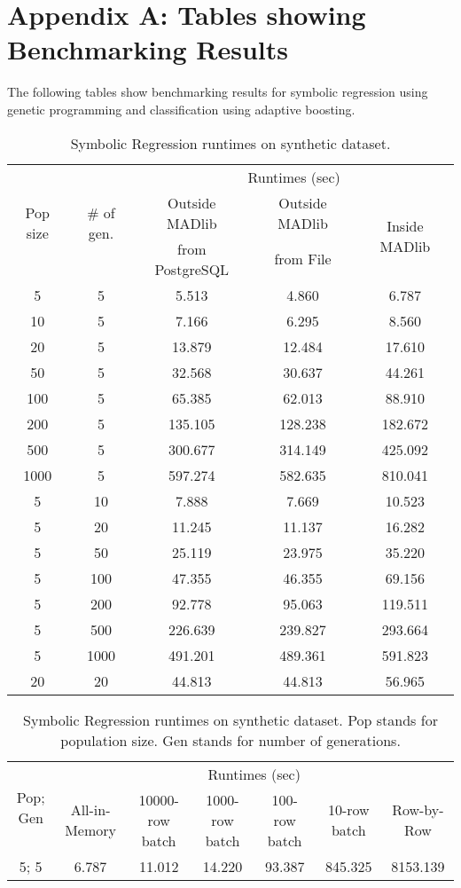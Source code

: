 \section*{Appendix A: Tables showing Benchmarking Results}
The following tables show benchmarking results for symbolic regression using genetic programming and classification using adaptive boosting.
\begin{table}[!htbp]
\small
\centering
\begin{tabular}{|c|c|c|c|c|}
\hline
\multirow{3}{*}{Pop size} & \multirow{3}{*}{\# of gen.} & \multicolumn{3}{|c|}{Runtimes (sec)}\\
\cline{3-5}
& &Outside MADlib&Outside MADlib&\multirow{2}{*}{Inside MADlib}\\
& &from PostgreSQL&from File&\\
\hline
5 & 5 & 5.513 & 4.860 & 6.787 \\ \hline
10& 5 & 7.166 & 6.295 & 8.560 \\\hline
20& 5 & 13.879 & 12.484 & 17.610 \\\hline
50& 5 & 32.568 & 30.637 & 44.261 \\\hline
100& 5 & 65.385 & 62.013 & 88.910 \\\hline
200& 5 & 135.105 & 128.238 & 182.672 \\\hline
500& 5 & 300.677 & 314.149 &425.092 \\\hline
1000& 5 & 597.274 &582.635 &810.041 \\\hline
5& 10 & 7.888 & 7.669& 10.523 \\\hline
5& 20 & 11.245 & 11.137 & 16.282 \\\hline
5& 50 & 25.119 & 23.975 & 35.220 \\\hline
5& 100 & 47.355 & 46.355 & 69.156 \\\hline
5& 200 & 92.778 & 95.063 & 119.511 \\\hline
5& 500 & 226.639 & 239.827 & 293.664 \\\hline
5& 1000 & 491.201 & 489.361 & 591.823 \\\hline
20& 20 & 44.813 & 44.813 & 56.965 \\
\hline
\end{tabular}
\caption{Symbolic Regression runtimes on synthetic dataset.}
\label{tab:GPruntimes}
\end{table}


\begin{table}[!htbp]
\small
\centering
\begin{tabular}{|c|c|c|c|c|c|c|}
\hline
\multirow{2}{*}{Pop; Gen} & \multicolumn{6}{|c|}{Runtimes (sec)}\\
\cline{2-7}
& All-in-Memory & 10000-row batch & 1000-row batch & 100-row batch & 10-row batch & Row-by-Row \\
\hline
5; 5 & 6.787 & 11.012 & 14.220 &  93.387 & 845.325 &8153.139 \\
\hline
\end{tabular}
\caption{Symbolic Regression runtimes on synthetic dataset. Pop stands for population size. Gen stands for number of generations.}
\label{tab:GPbatchRunTimes}
\end{table}


